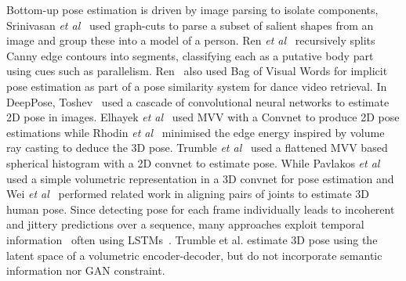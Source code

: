 \documentclass{bmvc2k}
\newcommand{\squeezeup}{\vspace{-2mm}}
\begin{document}
Bottom-up pose estimation is driven by image parsing to isolate components, Srinivasan \emph{et al}~\cite{srinivasan07} used graph-cuts to parse a subset of salient shapes from an image and group these into a model of a person. 
Ren  \emph{et al}~\cite{ren05} recursively splits Canny edge contours into segments, classifying each as a putative body part using cues such as parallelism. Ren~\cite{ren12} also used Bag of Visual Words for implicit pose estimation as part of a pose similarity system for dance video retrieval. 
In DeepPose, Toshev~\cite{Toshev2014} used a cascade of convolutional neural networks to estimate 2D pose in images. 
Elhayek \emph{et al}~\cite{elhayek_efficient_2015} used MVV with a Convnet to produce 2D pose estimations while Rhodin \emph{et al}~\cite{rhodin2016general} minimised the edge energy inspired by volume ray casting to deduce the 3D pose. 
Trumble \emph{et al}~\cite{TrumbleCVMP2DConvNet} used a flattened MVV based spherical histogram with a 2D convnet to estimate pose. While Pavlakos  \emph{et al}~\cite{pavlakos2017volumetricCVPR} used a simple volumetric representation in a 3D convnet for pose estimation and Wei \emph{et al}~\cite{wei2016cpm} performed related work in aligning pairs of joints to estimate 3D human pose. 
 Since detecting pose for each frame individually leads to incoherent and jittery predictions over a sequence, many approaches exploit temporal information~\cite{andriluka2014MPI2DPoseDataset,lin2017CVPRRPSM} often using LSTMs~\cite{hochreiter1997LSTM}. 
Trumble et al. \cite{trumble:eccv:2018} estimate 3D pose using the latent space of a volumetric encoder-decoder, but do not incorporate semantic information nor GAN constraint.

\squeezeup
\squeezeup
\end{document}
